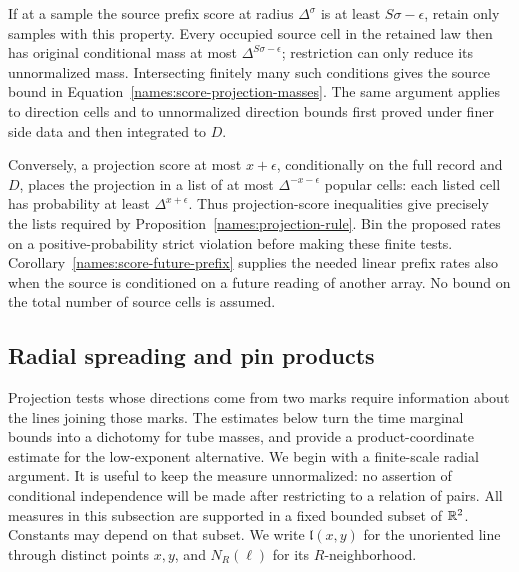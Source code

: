 \begin{remark}
\label{names:score-projection-trimming}
If at a sample the source prefix score at radius $\Delta^\sigma$ is
at least $S\sigma-\epsilon$, retain only samples with this property.
Every occupied source cell in the retained law then has original
conditional mass at most $\Delta^{S\sigma-\epsilon}$; restriction can
only reduce its unnormalized mass.  Intersecting finitely many such
conditions gives the source bound in
Equation~\eqref{names:score-projection-masses}.  The same argument
applies to direction cells and to unnormalized direction bounds first
proved under finer side data and then integrated to $D$.

Conversely, a projection score at most $x+\epsilon$, conditionally on
the full record and $D$, places the projection in a list of at most
$\Delta^{-x-\epsilon}$ popular cells: each listed cell has probability
at least $\Delta^{x+\epsilon}$.  Thus projection-score inequalities
give precisely the lists required by
Proposition~\ref{names:projection-rule}.  Bin the proposed rates on a
positive-probability strict violation before making these finite
tests.  Corollary~\ref{names:score-future-prefix} supplies the needed
linear prefix rates also when the source is conditioned on a future
reading of another array.  No bound on the total number of source
cells is assumed.
\end{remark}

\subsection{Radial spreading and pin products}
\label{names:radial-section}

Projection tests whose directions come from two marks require information
about the lines joining those marks. The estimates below turn the time
marginal bounds into a dichotomy for tube masses, and provide a
product-coordinate estimate for the low-exponent alternative.
We begin with a finite-scale radial argument. It is useful to keep the
measure unnormalized: no assertion of conditional
independence will be made after restricting to a relation of pairs.
All measures in this subsection are supported in a fixed bounded
subset of $\mathbb R^2$.  Constants may depend on that subset.  We write
$\mathfrak l(x,y)$ for the unoriented line through distinct points
$x,y$, and $N_R(\ell)$ for its $R$-neighborhood.


